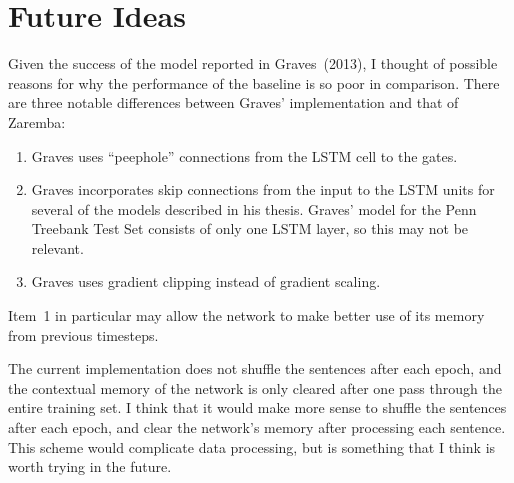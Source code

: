 \documentclass[11pt,a4paper]{article}
\begin{document}
\section{Future Ideas}

Given the success of the model reported in Graves~(2013), I thought of possible
reasons for why the performance of the baseline is so poor in comparison. There
are three notable differences between Graves' implementation and that of
Zaremba:
\begin{enumerate}
\item Graves uses ``peephole'' connections from the LSTM cell to the gates.
\item Graves incorporates skip connections from the input to the LSTM units for
several of the models described in his thesis. Graves' model for the Penn
Treebank Test Set consists of only one LSTM layer, so this may not be relevant.
\item Graves uses gradient clipping instead of gradient scaling.
\end{enumerate}
Item~1 in particular may allow the network to make better use of its memory from
previous timesteps.

The current implementation does not shuffle the sentences after each epoch, and
the contextual memory of the network is only cleared after one pass through the
entire training set. I think that it would make more sense to shuffle the
sentences after each epoch, and clear the network's memory after processing each
sentence. This scheme would complicate data processing, but is something that I
think is worth trying in the future.
\end{document}
